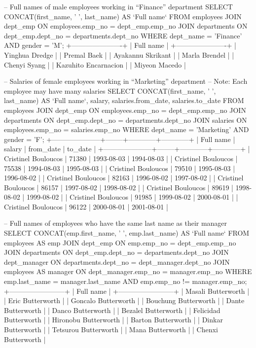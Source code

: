 -- Full names of male employees working in “Finance” department
SELECT 
    CONCAT(first_name, ' ', last_name) AS `Full name`
FROM
    employees
        JOIN
    dept_emp ON employees.emp_no = dept_emp.emp_no
        JOIN
    departments ON dept_emp.dept_no = departments.dept_no
WHERE
    dept_name = 'Finance' AND gender = 'M';
+----------------------+
| Full name            |
+----------------------+
| Yinghua Dredge       |
| Premal Baek          |
| Ayakannu Skrikant    |
| Marla Brendel        |
| Chenyi Syang         |
| Kazuhito Encarnacion |
| Miyeon Macedo        |
    
-- Salaries of female employees working in “Marketing” department
-- Note: Each employee may have many salaries
SELECT 
    CONCAT(first_name, ' ', last_name) AS `Full name`, salary, salaries.from_date, salaries.to_date
FROM
    employees
        JOIN
    dept_emp ON employees.emp_no = dept_emp.emp_no
        JOIN
    departments ON dept_emp.dept_no = departments.dept_no
         JOIN
	salaries ON employees.emp_no = salaries.emp_no
WHERE
    dept_name = 'Marketing' AND gender = 'F';
+---------------------+--------+------------+------------+
| Full name           | salary | from_date  | to_date    |
+---------------------+--------+------------+------------+
| Cristinel Bouloucos |  71380 | 1993-08-03 | 1994-08-03 |
| Cristinel Bouloucos |  75538 | 1994-08-03 | 1995-08-03 |
| Cristinel Bouloucos |  79510 | 1995-08-03 | 1996-08-02 |
| Cristinel Bouloucos |  82163 | 1996-08-02 | 1997-08-02 |
| Cristinel Bouloucos |  86157 | 1997-08-02 | 1998-08-02 |
| Cristinel Bouloucos |  89619 | 1998-08-02 | 1999-08-02 |
| Cristinel Bouloucos |  91985 | 1999-08-02 | 2000-08-01 |
| Cristinel Bouloucos |  96122 | 2000-08-01 | 2001-08-01 |
    
-- Full names of employees who have the same last name as their manager
SELECT 
    CONCAT(emp.first_name, ' ', emp.last_name) AS `Full name`
FROM
    employees AS emp
        JOIN
    dept_emp ON emp.emp_no = dept_emp.emp_no
        JOIN
    departments ON dept_emp.dept_no = departments.dept_no
        JOIN
    dept_manager ON departments.dept_no = dept_manager.dept_no
        JOIN
    employees AS manager ON dept_manager.emp_no = manager.emp_no
WHERE
    emp.last_name = manager.last_name
        AND emp.emp_no != manager.emp_no;
+------------------------+
| Full name              |
+------------------------+
| Masali Butterworth     |
| Eric Butterworth       |
| Goncalo Butterworth    |
| Bouchung Butterworth   |
| Dante Butterworth      |
| Danco Butterworth      |
| Bezalel Butterworth    |
| Felicidad Butterworth  |
| Hironobu Butterworth   |
| Barton Butterworth     |
| Dinkar Butterworth     |
| Tetsurou Butterworth   |
| Mana Butterworth       |
| Chenxi Butterworth     |


